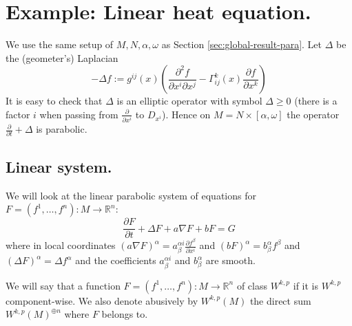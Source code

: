\section{Example: Linear heat equation.}
\label{sec:org0e058a2}

We use the same setup of \(M,N,\alpha,\omega\) as Section
\ref{sec:global-result-para}. Let \(\Delta\) be the (geometer's)
Laplacian
\[ 
-\Delta f:= g^{ij}(x) \left( \frac{\partial^2 f}{\partial x^i \partial x^j} - \Gamma_{ij}^k(x)
\frac{\partial f}{\partial x^k}\right) 
\]
It is easy to check that \(\Delta\) is an elliptic operator with symbol \(\Delta \geq
0\) (there is a factor \(i\) when passing from \(\frac{\partial}{\partial x^i}\) to \(D_{x^i}\)). Hence on \(M = N\times [\alpha,\omega]\) the operator \(\frac{\partial}{\partial t}+ \Delta\) is parabolic.

\subsection{Linear system.}
\label{sec:org5395cc9}
We will look at the linear parabolic system of equations for \(F = (f^1,\dots, f^n): M
\longrightarrow \mathbb{R}^n\):
\begin{equation}
\label{eq:para-system}
\frac{\partial F}{\partial t} + \Delta F + a \nabla F + bF = G
\end{equation}
where in local coordinates \((a \nabla F)^\alpha = a^{\alpha i}_\beta \frac{\partial f^\beta}{\partial x^i}\)
and \((bF)^\alpha = b^\alpha_\beta f^\beta\) and \((\Delta F)^\alpha = \Delta
f^\alpha\) and the coefficients \(a^{\alpha i}_\beta\) and \(b^\alpha_\beta\) are
smooth.

We will say that a function \(F=(f^1,\dots, f^n): M \longrightarrow \mathbb{R}^n\) of class
\(W^{k,p}\) if it is \(W^{k,p}\) component-wise. We also denote abusively by \(W^{k,p}(M)\) the direct sum \(W^{k,p}(M)^{\oplus n}\) where \(F\) belongs to.

